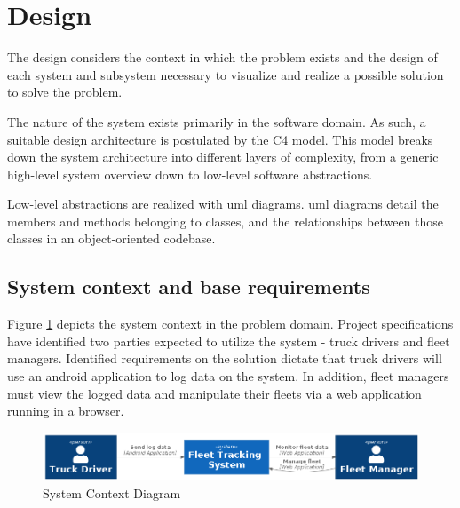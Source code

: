 \section{Design}
The design considers the context in which the problem exists and the design of each system and subsystem necessary to visualize and realize a possible solution to solve the problem.

The nature of the system exists primarily in the software domain.
As such, a suitable design architecture is postulated by the C4 model.
This model breaks down the system architecture into different layers of complexity, from a generic high-level system overview down to low-level software abstractions.\cite{vazquez2020c4}

Low-level abstractions are realized with \ac{uml} diagrams. \Ac{uml} diagrams detail the members and methods belonging to classes, and the relationships between those classes in an object-oriented codebase. \cite{petre2013uml}

\subsection{System context and base requirements }
Figure \ref{fig:system_context} depicts the system context in the problem domain.
Project specifications have identified two parties expected to utilize the system - truck drivers and fleet managers.
Identified requirements on the solution dictate that truck drivers will use an android application to log data on the system.
In addition, fleet managers must view the logged data and manipulate their fleets via a web application running in a browser.

\begin{figure}[H]
\centering
\includegraphics[width=6in]{../diag/system_context.png}
\caption{System Context Diagram}
\label{fig:system_context}
\end{figure}

